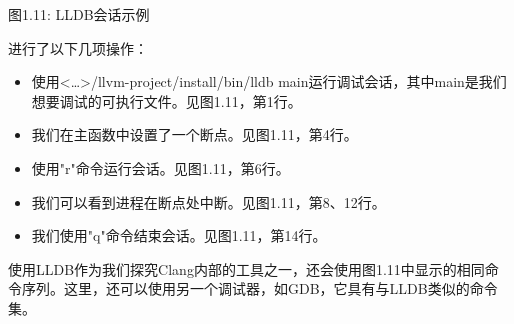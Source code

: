 \begin{center}
图1.11: LLDB会话示例
\end{center}

进行了以下几项操作：

\begin{itemize}
\item
使用<…>/llvm-project/install/bin/lldb main运行调试会话，其中main是我们想要调试的可执行文件。见图1.11，第1行。

\item
我们在主函数中设置了一个断点。见图1.11，第4行。

\item
使用"r"命令运行会话。见图1.11，第6行。

\item
我们可以看到进程在断点处中断。见图1.11，第8、12行。

\item
我们使用"q"命令结束会话。见图1.11，第14行。
\end{itemize}

使用LLDB作为我们探究Clang内部的工具之一，还会使用图1.11中显示的相同命令序列。这里，还可以使用另一个调试器，如GDB，它具有与LLDB类似的命令集。







